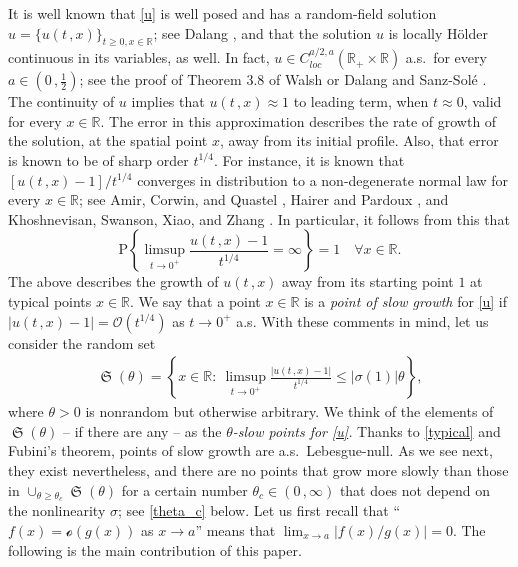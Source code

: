 \documentclass[reqno]{amsart}
\DeclareMathOperator{\fS}{\mathfrak S}
\newcommand{\<}{\langle}
\renewcommand{\>}{\rangle}
\newcommand{\R}{\mathbb{R}}
\renewcommand{\P}{\mathrm{P}}
\newcommand{\1}{\mathbb{1}}
\renewcommand{\ge}{\geqslant}
\renewcommand{\le}{\leqslant}
\theoremstyle{definition}
\numberwithin{equation}{section}
\begin{document}
It is well known that  \eqref{u} is well posed
and has a random-field solution $u=\{u(t\,,x)\}_{t\ge0,x\in\R}$; 
see Dalang \cite{Dalang1999}, and that the solution $u$ is locally 
H\"older continuous in its variables, as well. In fact,
$u\in C^{a/2,a}_{\textit{loc}}(\R_+\times\R)$ a.s.~for every $a\in(0\,,\frac12)$; 
see the proof of Theorem 3.8 of Walsh \cite{Walsh} or 
Dalang and Sanz-Sol\'e \cite[Proposition 3.3.8]{DS}.
The continuity of $u$ implies that $u(t\,,x)\approx1$ to leading term,
when $t\approx0$, valid for every $x\in\R$. The error in this approximation
describes the rate of growth of the solution, at the spatial point $x$,
away from its initial profile. Also, that error is known to be of sharp order $t^{1/4}$.
For instance, it is known that
$[u(t\,,x)-1]/t^{1/4}$ converges in distribution to a non-degenerate normal
law for every $x\in\R$; see  Amir, Corwin, and Quastel \cite{ACQ},
Hairer and Pardoux \cite{HairerPardoux}, and Khoshnevisan, Swanson, 
Xiao, and Zhang \cite{KSXZ}.
In particular, it follows from this that
\begin{equation}\label{typical}
	\P\left\{\limsup_{t\to0^+}\frac{u(t\,,x)-1}{t^{1/4}} =\infty\right\}=1
	\quad\forall x\in\R.
\end{equation}
The above describes the growth of $u(t\,,x)$ away from its 
starting point $1$ at typical points $x\in\R$.
We say that a point $x\in\R$ is a \emph{point of slow growth}
for \eqref{u} if $|u(t\,,x)-1|=\mathcal{O}(t^{1/4})$ as $t\to0^+$
a.s. 
With these comments in mind, let us consider the random set
\begin{align}\label{S_u(theta)}
	\fS(\theta) = \left\{ x \in\R :\ \limsup_{t \to 0^+} 
	\frac{|u(t\,,x)-1|}{t^{1/4}} \le |\sigma(1)| \theta \right\},
\end{align}
where $\theta>0$ is nonrandom but otherwise arbitrary. 
We think of the elements of $\fS(\theta)$ -- if there are any --
as the \emph{$\theta$-slow points for \eqref{u}.}
Thanks to \eqref{typical} and Fubini's theorem, points of slow growth
are a.s.~Lebesgue-null. As we see next, they exist nevertheless,
and there are no points that grow more slowly than those in $\cup_{\theta\ge\theta_c}
\fS(\theta)$ for a certain number $\theta_c \in (0\,,\infty)$ that
does not depend on the nonlinearity $\sigma$;
see \eqref{theta_c} below. 
Let us first recall that ``$f(x) = \mathscr{o}(g(x))$ as $x\to a$'' 
means that $\lim_{x\to a}|f(x)/g(x)|=0$.
The following is the main
contribution of this paper.
\end{document}
